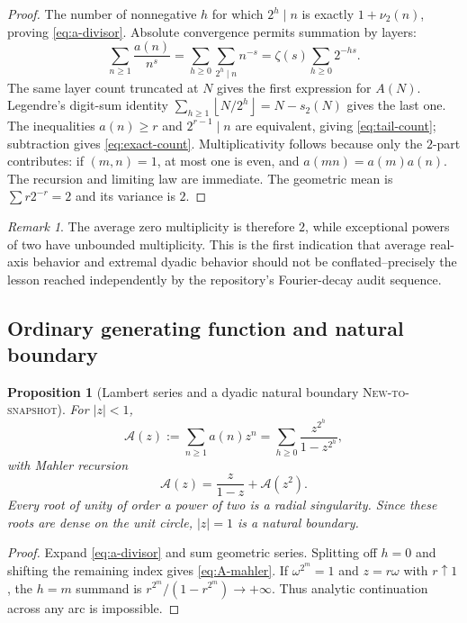 \documentclass[11pt,oneside]{article}
\numberwithin{equation}{section}
\newtheorem{proposition}[theorem]{Proposition}
\theoremstyle{definition}
\theoremstyle{remark}
\newtheorem{remark}[theorem]{Remark}
\newcommand{\floor}[1]{\left\lfloor #1\right\rfloor}
\newcommand{\NewResult}{\textsc{New-to-snapshot}}
\begin{document}
\begin{proof}
The number of nonnegative $h$ for which $2^h\mid n$ is exactly
$1+\nu_2(n)$, proving \eqref{eq:a-divisor}.  Absolute convergence permits
summation by layers:
\[
 \sum_{n\ge1}\frac{a(n)}{n^s}
 =\sum_{h\ge0}\sum_{2^h\mid n}n^{-s}
 =\zeta(s)\sum_{h\ge0}2^{-hs}.
\]
The same layer count truncated at $N$ gives the first expression for $A(N)$.
Legendre's digit-sum identity
$\sum_{h\ge1}\floor{N/2^h}=N-s_2(N)$ gives the last one.
The inequalities $a(n)\ge r$ and $2^{r-1}\mid n$ are equivalent, giving
\eqref{eq:tail-count}; subtraction gives \eqref{eq:exact-count}.
Multiplicativity follows because only the $2$-part contributes: if $(m,n)=1$,
at most one is even, and $a(mn)=a(m)a(n)$.  The recursion and limiting law are
immediate.  The geometric mean is $\sum r2^{-r}=2$ and its variance is $2$.
\end{proof}

\begin{remark}
The average zero multiplicity is therefore $2$, while exceptional powers of two
have unbounded multiplicity.  This is the first indication that average real-axis
behavior and extremal dyadic behavior should not be conflated--precisely the
lesson reached independently by the repository's Fourier-decay audit sequence.
\end{remark}

\subsection{Ordinary generating function and natural boundary}

\begin{proposition}[Lambert series and a dyadic natural boundary \NewResult]
\label{prop:ogf}
For $|z|<1$,
\begin{equation}
 \mathcal A(z):=\sum_{n\ge1}a(n)z^n
 =\sum_{h\ge0}\frac{z^{2^h}}{1-z^{2^h}},                  \label{eq:A-ogf}
\end{equation}
with Mahler recursion
\begin{equation}
 \mathcal A(z)=\frac{z}{1-z}+\mathcal A(z^2).              \label{eq:A-mahler}
\end{equation}
Every root of unity of order a power of two is a radial singularity.  Since these
roots are dense on the unit circle, $|z|=1$ is a natural boundary.
\end{proposition}

\begin{proof}
Expand \eqref{eq:a-divisor} and sum geometric series.  Splitting off $h=0$
and shifting the remaining index gives \eqref{eq:A-mahler}.  If $\omega^{2^m}=1$
and $z=r\omega$ with $r\uparrow1$, the $h=m$ summand is
$r^{2^m}/(1-r^{2^m})\to+\infty$.  Thus analytic continuation across any arc is
impossible.
\end{proof}
\end{document}
